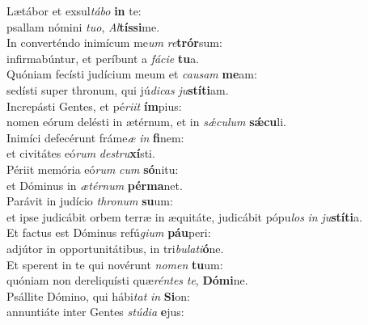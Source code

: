 \evenverse Lætábor et exsul\textit{tá}\textit{bo} \textbf{in} te:~\*\\
\evenverse psallam nómini \textit{tu}\textit{o}, \textit{Al}\textbf{tís}\textbf{si}me.\\
\oddverse In converténdo inimícum me\textit{um} \textit{re}\textbf{trór}sum:~\*\\
\oddverse infirmabúntur, et períbunt a \textit{fá}\textit{ci}\textit{e} \textbf{tu}a.\\
\evenverse Quóniam fecísti judícium meum et \textit{cau}\textit{sam} \textbf{me}am:~\*\\
\evenverse sedísti super thronum, qui jú\textit{di}\textit{cas} \textit{ju}\textbf{stí}\textbf{ti}am.\\
\oddverse Increpásti Gentes, et pé\textit{ri}\textit{it} \textbf{ím}pius:~\*\\
\oddverse nomen eórum delésti in ætérnum, et in \textit{sǽ}\textit{cu}\textit{lum} \textbf{sǽ}\textbf{cu}li.\\
\evenverse Inimíci defecérunt fráme\textit{æ} \textit{in} \textbf{fi}nem:~\*\\
\evenverse et civitátes eó\textit{rum} \textit{de}\textit{stru}\textbf{xí}sti.\\
\oddverse Périit memória eó\textit{rum} \textit{cum} \textbf{só}nitu:~\*\\
\oddverse et Dóminus in \textit{æ}\textit{tér}\textit{num} \textbf{pér}\textbf{ma}net.\\
\evenverse Parávit in judício \textit{thro}\textit{num} \textbf{su}um:~\*\\
\evenverse et ipse judicábit orbem terræ in æquitáte, judicábit pópu\textit{los} \textit{in} \textit{ju}\textbf{stí}\textbf{ti}a.\\
\oddverse Et factus est Dóminus refú\textit{gi}\textit{um} \textbf{páu}peri:~\*\\
\oddverse adjútor in opportunitátibus, in tri\textit{bu}\textit{la}\textit{ti}\textbf{ó}ne.\\
\evenverse Et sperent in te qui novérunt \textit{no}\textit{men} \textbf{tu}um:~\*\\
\evenverse quóniam non dereliquísti quæ\textit{rén}\textit{tes} \textit{te}, \textbf{Dó}\textbf{mi}ne.\\
\oddverse Psállite Dómino, qui hábi\textit{tat} \textit{in} \textbf{Si}on:~\*\\
\oddverse annuntiáte inter Gentes \textit{stú}\textit{di}\textit{a} \textbf{e}jus:\\

